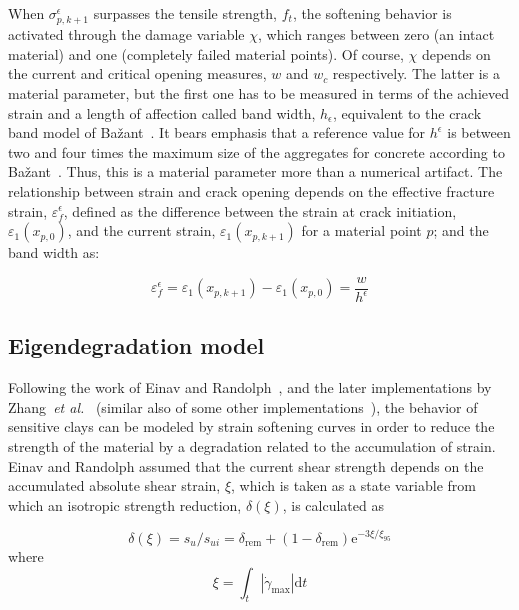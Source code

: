 \documentclass[applsci,journal,article,submit,moreauthors,pdftex]{Definitions/mdpi}
\begin{document}
When $\sigma^{\epsilon}_{p,k+1}$ surpasses the tensile strength, $f_t$,  the softening behavior is activated through the damage variable $\chi$, which ranges between zero (an intact material) and one (completely failed material points). Of course, $\chi$ depends on the current and critical opening measures, $w$ and $w_c$ respectively.  The latter is a material parameter, but the first one has to be measured in terms of the achieved strain and a length of affection called band width, $h_\epsilon$, equivalent to the crack band model of Ba\v{z}ant~\cite{Bazant83}. It bears emphasis that  a reference value for $h^{\epsilon}$ is between two and four times the maximum size of the aggregates for concrete according to Ba\v{z}ant~\cite{Bazant98}. Thus, this is a material parameter more than a numerical artifact. The relationship between strain and crack opening depends on the effective fracture strain, $\varepsilon^{\epsilon}_f$, defined as the difference between the strain at crack initiation, $\varepsilon_1(x_{p,0})$, and the current strain, $ \varepsilon_1(x_{p,k+1})$ for a material point $p$; and the band width as:

\begin{equation} \label{eq15}
 \varepsilon_f^{\epsilon} = \varepsilon_1(x_{p,k+1}) - \varepsilon_1(x_{p,0})  =  \frac{w}{h^{\epsilon}}
\end{equation}

\subsection{Eigendegradation model}
Following the work of Einav and Randolph~\cite{Zhang2015}, and the later implementations by Zhang~\textit{et al.}~\cite{Zhang2015} (similar also of some other implementations~\cite{Wang21,Singh21}), the behavior of sensitive clays can be modeled by strain softening curves in order to reduce the strength of the material by a degradation related to the accumulation of strain. Einav and Randolph assumed that the current shear strength depends on the accumulated absolute shear strain, $\xi$, which is taken as a state variable from which an isotropic strength reduction, $\delta(\xi)$, is calculated as

\begin{equation} \label{eq16}
\delta(\xi)=s_{u} / s_{u i}=\delta_{\mathrm{rem}}+\left(1-\delta_{\mathrm{rem}}\right) \mathrm{e}^{-3 \xi / \xi_{95}}
\end{equation}
where
\begin{equation}\label{eq17}
\xi=\int_{t}\left|\dot{\gamma}_{\max }\right| \mathrm{d} t
\end{equation}
\end{document}
